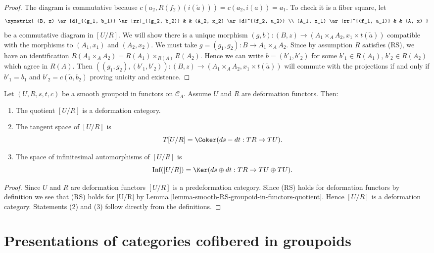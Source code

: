 \begin{proof}
\medskip\noindent
The diagram is commutative because
$c(a_2, R(f_2)(i(\widetilde{a}))) = c(a_2, i(a)) = a_1$.
To check it is a fiber square, let
$$
\xymatrix{
(B, z) \ar[d]_{(g_1, b_1)} \ar[rr]_{(g_2, b_2)} & & (A_2, x_2)
\ar[d]^{(f_2, a_2)} \\
(A_1, x_1) \ar[rr]^{(f_1, a_1)} & & (A, x)
}
$$
be a commutative diagram in $[U/R]$. We will show there is a unique morphism
$(g, b) : (B, z) \to (A_1 \times_A A_2, x_1 \times t(\widetilde{a}))$
compatible with the morphisms to $(A_1, x_1)$ and $(A_2, x_2)$.
We must take $g = (g_1, g_2) : B \to A_1 \times_A A_2$.
Since by assumption $R$ satisfies (RS), we have an identification
$R(A_1 \times_A A_2) = R(A_1) \times_{R(A)} R(A_2)$.
Hence we can write $b = (b'_1, b'_2)$ for some
$b'_1 \in R(A_1)$, $b'_2 \in R(A_2)$ which agree in $R(A)$.
Then
$((g_1, g_2), (b'_1, b'_2)) : (B, z) \to
(A_1 \times_A A_2, x_1 \times t(\widetilde{a}))$
will commute with the projections if and only if
$b'_1 = b_1$ and $b'_2 = c(\widetilde{a}, b_2)$ proving unicity and
existence.
\end{proof}

\begin{lemma}
\label{lemma-deformation-groupoid-quotient}
Let $(U, R, s, t, c)$ be a smooth groupoid in functors on $\mathcal{C}_\Lambda$.
Assume $U$ and $R$ are deformation functors. Then:
\begin{enumerate}
\item The quotient $[U/R]$ is a deformation category.
\item The tangent space of $[U/R]$ is
$$
T[U/R] = \Coker(ds-dt: TR \to TU).
$$
\item The space of infinitesimal automorphisms of $[U/R]$ is
$$
\text{Inf}([U/R]) =
\Ker(ds \oplus dt : TR \to TU \oplus TU).
$$
\end{enumerate}
\end{lemma}

\begin{proof}
Since $U$ and $R$ are deformation functors $[U/R]$ is a predeformation
category. Since (RS) holds for deformation functors by
definition we see that (RS) holds for [U/R] by
Lemma \ref{lemma-smooth-RS-groupoid-in-functors-quotient}.
Hence $[U/R]$ is a deformation category. Statements (2) and (3)
follow directly from the definitions.
\end{proof}







\section{Presentations of categories cofibered in groupoids}
\label{section-presentation-categories-cofibred-in-groupoids}

